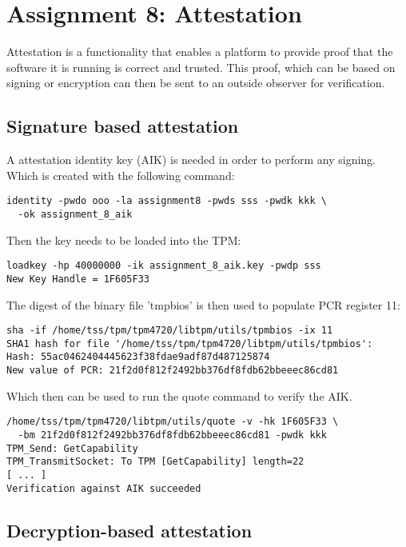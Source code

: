 \documentclass[10pt]{article}
\begin{document}
\section{Assignment 8: Attestation}

  Attestation is a functionality that enables a platform to provide proof that
  the software it is running is correct and trusted. This proof, which can be
  based on signing or encryption can then be sent to an outside observer for
  verification.

  \subsection{Signature based attestation}

    A attestation identity key (AIK) is needed in order to perform any signing.
    Which is created with the following command:
\begin{verbatim}
identity -pwdo ooo -la assignment8 -pwds sss -pwdk kkk \
  -ok assignment_8_aik
\end{verbatim}

    Then the key needs to be loaded into the TPM:

\begin{verbatim}
loadkey -hp 40000000 -ik assignment_8_aik.key -pwdp sss
New Key Handle = 1F605F33
\end{verbatim}

    The digest of the binary file 'tmpbios' is then used to populate PCR
    register 11:

\begin{verbatim}
sha -if /home/tss/tpm/tpm4720/libtpm/utils/tpmbios -ix 11
SHA1 hash for file '/home/tss/tpm/tpm4720/libtpm/utils/tpmbios':
Hash: 55ac0462404445623f38fdae9adf87d487125874
New value of PCR: 21f2d0f812f2492bb376df8fdb62bbeeec86cd81
\end{verbatim}

    Which then can be used to run the quote command to verify the AIK.

\begin{verbatim}
/home/tss/tpm/tpm4720/libtpm/utils/quote -v -hk 1F605F33 \
  -bm 21f2d0f812f2492bb376df8fdb62bbeeec86cd81 -pwdk kkk
TPM_Send: GetCapability
TPM_TransmitSocket: To TPM [GetCapability] length=22
[ ... ]
Verification against AIK succeeded
\end{verbatim}

  \subsection{Decryption-based attestation}
\end{document}
